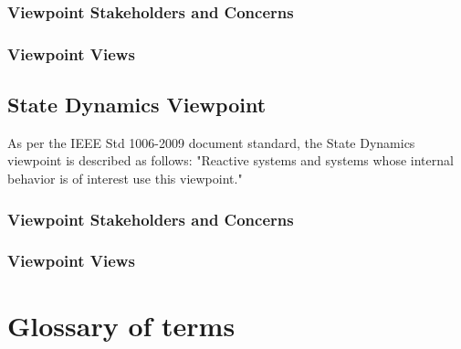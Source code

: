 \documentclass[onecolumn, draftclsnofoot,10pt, compsoc]{IEEEtran}
\newcounter{subsubsubsection}[subsubsection]
\begin{document}
        \subsubsection{Viewpoint Stakeholders and Concerns}
        \subsubsection{Viewpoint Views}
            
        \subsection{State Dynamics Viewpoint}
        As per the IEEE Std 1006-2009 document standard, the State Dynamics viewpoint is described as follows: "Reactive systems and systems whose internal behavior is of interest use this viewpoint."
        \subsubsection{Viewpoint Stakeholders and Concerns}
        \subsubsection{Viewpoint Views}
          
        \section{Glossary of terms}
        
        \pagebreak
        \nocite{*} %
        
            
        
    
\end{document}
